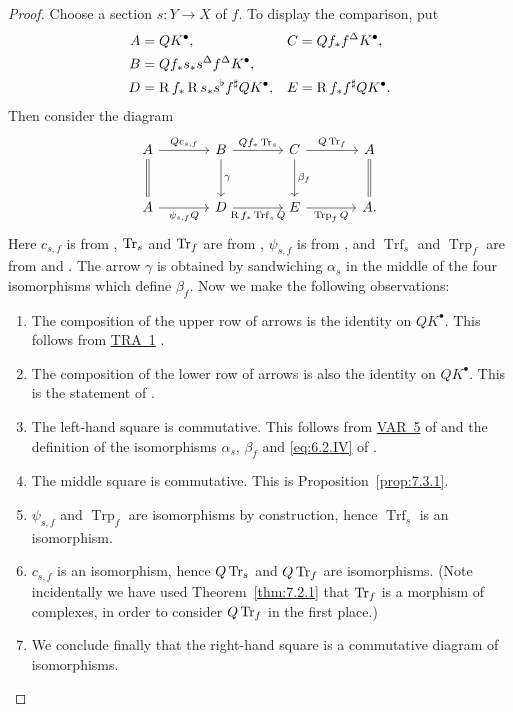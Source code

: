 \begin{proof}
Choose a section $s\colon Y\to X$ of $f$. To display the comparison, put
\[
\begin{aligned}
A&=QK^\bullet, & C&=Qf_*f^\Delta K^\bullet,\\
B&=Qf_*s_*s^\Delta f^\Delta K^\bullet,\\
D&=\operatorname{R} f_*\operatorname{R} s_*s^\flat f^\sharp QK^\bullet,
& E&=\operatorname{R} f_*f^\sharp QK^\bullet.
\end{aligned}
\]
Then consider the diagram
\[
\begin{tikzcd}[row sep=large, column sep=large]
A \ar[r,"Q c_{s,f}"] \ar[d,equals]
 & B \ar[r,"Qf_*\Tr_s"] \ar[d,"\gamma"]
 & C \ar[r,"Q\Tr_f"] \ar[d,"\beta_f"]
 & A \ar[d,equals] \\
A \ar[r,"\psi_{s,f}Q"']
 & D \ar[r,"\RR f_*\operatorname{Trf}_s Q"']
 & E \ar[r,"\operatorname{Trp}_f Q"'] & A.
\end{tikzcd}
\]
Here $c_{s,f}$ is from ,
$\operatorname{Tr}_s$ and $\operatorname{Tr}_f$ are from ,
$\psi_{s,f}$ is from , and
$\operatorname{Trf}_s$ and $\operatorname{Trp}_f$ are from
 and .
The arrow $\gamma$ is obtained by sandwiching $\alpha_s$ in the middle
of the four isomorphisms which define $\beta_f$.
Now we make the following observations:
\begin{enumerate}
\item[(1)] The composition of the upper row of arrows is the identity on $Q K^{\bullet}$. This follows from \hyperref[tra:6.4.1]{TRA~1} .
\item[(2)] The composition of the lower row of arrows is also the identity on $Q K^{\bullet}$. This is the statement of .
\item[(3)] The left-hand square is commutative. This follows from \hyperref[var:6.3.5]{VAR~5} of  and the definition of the isomorphisms $\alpha_{s}$, $\beta_{f}$ and \eqref{eq:6.2.IV} of .
\item[(4)] The middle square is commutative. This is Proposition~\ref{prop:7.3.1}.
\item[(5)] $\psi_{s,f}$ and $\operatorname{Trp}_{f}$ are isomorphisms by construction, hence $\operatorname{Trf}_{s}$ is an isomorphism.
\item[(6)] $c_{s,f}$ is an isomorphism, hence $Q \operatorname{Tr}_{s}$ and $Q \operatorname{Tr}_{f}$ are isomorphisms. (Note incidentally we have used Theorem~\ref{thm:7.2.1} that $\operatorname{Tr}_{f}$ is a morphism of complexes, in order to consider $Q \operatorname{Tr}_{f}$ in the first place.)
\item[(7)] We conclude finally that the right-hand square is a commutative diagram of isomorphisms.
\end{enumerate}
\end{proof}

